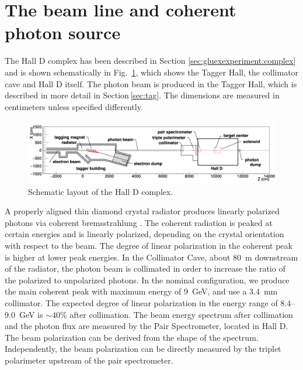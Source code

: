 
\section[The beam line and coherent photon source (Stuart)]{The beam line and coherent photon source \label{sec:beamline}}



The Hall D complex has been described in Section \ref{sec:gluexexperiment:complex} and is shown schematically in Fig.~\ref{fig:beam:Draw_beamline}, which shows the Tagger Hall, the collimator cave and Hall D itself. The photon beam is produced in the Tagger Hall, which is described in more detail in Section\,\ref{sec:tag}.
The dimensions are measured in centimeters unless specified differently.

\begin{figure}[t]
\begin{center}
 \includegraphics[clip=true,width=0.98\linewidth]{figures/Draw_beamline.png}
\end{center}
\caption{Schematic layout of the Hall D complex.
        }
\label{fig:beam:Draw_beamline} 
\end{figure}


A properly aligned thin diamond crystal radiator produces linearly polarized photons via coherent bremsstrahlung \cite{timm1969}.
The coherent radiation is peaked at certain energies and is linearly polarized, depending on the crystal orientation with respect to the beam.
The degree of linear polarization in the coherent peak is higher at lower peak energies.
In the Collimator Cave, about 80~m downstream of the radiator, the photon beam is collimated in order to increase the ratio of the polarized to unpolarized photons.  In the nominal \GX{} configuration, we produce the main coherent peak
with maximum energy of 9~GeV, and use a 3.4~mm collimator.
The expected degree of linear polarization in the energy range of
8.4--9.0~GeV is $\sim$40\% after collimation. The beam energy spectrum
after collimation and the photon flux are measured by the Pair
Spectrometer, located in Hall D. The beam polarization can be derived
from the shape of the spectrum. Independently, the beam polarization
can be directly measured by the triplet polarimeter upstream of the
pair spectrometer.

